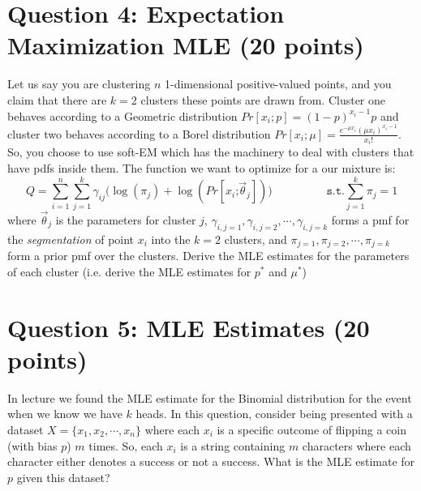\documentclass[11pt]{article}
\newcommand{\question}[1]{\section*{\normalsize #1}}
\begin{document}
\question{Question 4: Expectation Maximization MLE (20 points)}
Let us say you are clustering $n$ 1-dimensional positive-valued points, and you claim that there are $k=2$ clusters these points are drawn from. Cluster one behaves according to a Geometric distribution $Pr[x_i;p] = (1-p)^{x_i-1}p$ and cluster two behaves according to a Borel distribution $Pr[x_i;\mu]=\frac{e^{-\mu x_i}(\mu x_i)^{x_i-1}}{x_i!}$. So, you choose to use soft-EM which has the machinery to deal with clusters that have pdfs inside them. The function we want to optimize for a our mixture is:
$$Q = \sum\limits_{i=1}^n\sum\limits_{j=1}^k \gamma_{ij}\Big(\log(\pi_j) + \log(Pr[x_i \textbf{;} \vec{\theta}_j])\Big) \hspace{2cm}\texttt{s.t.} \sum\limits_{j=1}^k \pi_j = 1$$
where $\vec{\theta}_j$ is the parameters for cluster $j$, $\gamma_{i, j=1}, \gamma_{i, j=2}, \cdots,\gamma_{i, j=k}$ forms a pmf for the \textit{segmentation} of point $x_i$ into the $k=2$ clusters, and $\pi_{j=1}, \pi_{j=2}, \cdots, \pi_{j=k}$ form a prior pmf over the clusters. Derive the MLE estimates for the parameters of each cluster (i.e. derive the MLE estimates for $p^*$ and $\mu^*$)\newpage































\question{Question 5: MLE Estimates (20 points)}
In lecture we found the MLE estimate for the Binomial distribution for the event when we know we have $k$ heads. In this question, consider being presented with a dataset $X = \{x_1, x_2, \cdots, x_n\}$ where each $x_i$ is a specific outcome of flipping a coin (with bias $p$) $m$ times. So, each $x_i$ is a string containing $m$ characters where each character either denotes a success or not a success. What is the MLE estimate for $p$ given this dataset?\newpage
\end{document}
